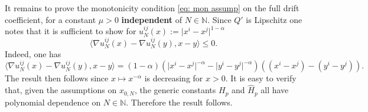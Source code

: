 \documentclass{article}
\begin{document}
It remains to prove the monotonicity condition \eqref{eq: mon assump} on the full drift coefficient, for a constant $\mu>0$ \textbf{independent} of $N\in \mathbb{N}$. Since $Q'$ is Lipschitz one notes that it is sufficient to show for $u_N^{ij}(x):=\lvert x^i-x^j\rvert^{1-\alpha}$
    \begin{equation}
        \langle \nabla u^{ij}_N(x)-\nabla u^{ij}_N(y),x-y\rangle\leq 0.
    \end{equation}
    Indeed, one has
    \begin{equation}
        \langle \nabla u^{ij}_N(x)-\nabla u^{ij}_N(y),x-y\rangle = (1-\alpha)(\lvert x^i-x^j\rvert^{-\alpha}-\lvert y^i-y^j\rvert^{-\alpha})((x^i-x^j)-(y^i-y^j)).
    \end{equation}
    The result then follows since $x\mapsto x^{-\alpha}$ is decreasing for $x>0$. It is easy to verify that, given the assumptions on $x_{0,N}$, the generic constants $H_p$ and $\hat{H}_p$ all have polynomial dependence on $N\in \mathbb{N}$. Therefore the result follows.
\end{document}
